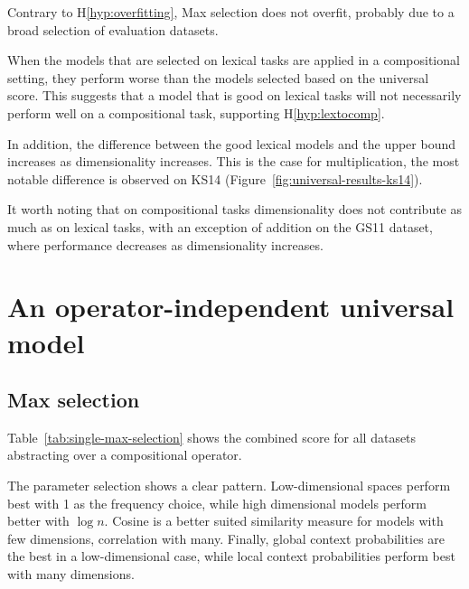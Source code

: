 Contrary to H\ref{hyp:overfitting}, Max selection does not overfit, probably due to a broad selection of evaluation datasets.

When the models that are selected on lexical tasks are applied in a compositional setting, they perform worse than the models selected based on the universal score. This suggests that a model that is good on lexical tasks will not necessarily perform well on a compositional task, supporting H\ref{hyp:lextocomp}.

In addition, the difference between the good lexical models and the upper bound increases as dimensionality increases. This is the case for multiplication, the most notable difference is observed on KS14 (Figure~\ref{fig:universal-results-ks14}).

It worth noting that on compositional tasks dimensionality does not contribute as much as on lexical tasks, with an exception of addition on the GS11 dataset, where performance decreases as dimensionality increases.

\section{An operator-independent universal model}


\subsection{Max selection}
\label{sec:max-selection-single}

Table~\ref{tab:single-max-selection} shows  the combined score for all datasets abstracting over a compositional operator.

The parameter selection shows a clear pattern. Low-dimensional spaces perform best with 1 as the frequency choice, while high dimensional models perform better with $\log n$. Cosine is a better suited similarity measure for models with few dimensions, correlation with many. Finally, global context probabilities are the best in a low-dimensional case, while local context probabilities perform best with many dimensions.

